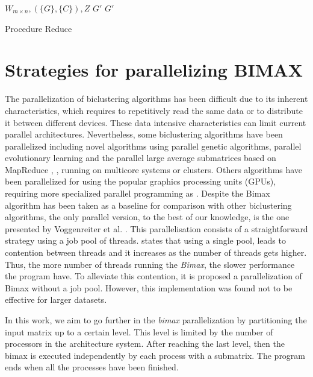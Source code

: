 \documentclass[a4paper,conference]{IEEEtran}
\begin{document}
\begin{algorithm}
\begin{algorithmic}[1]
\REQUIRE $W_{m\times n}, (\{G\}, \{C\}), Z$
\ENSURE $G'$
\ENDIF
\ENDFOR
\RETURN $G'$
\caption{Procedure Reduce}\label{alg:Reduce}
\end{algorithmic}
\end{algorithm}

\section{Strategies for parallelizing BIMAX}
The parallelization of biclustering algorithms has been difficult due to its inherent characteristics, which requires to repetitively read the same data or to distribute it between different devices. These data intensive characteristics can limit current parallel architectures.
Nevertheless, some biclustering algorithms have been parallelized including novel algorithms using parallel genetic algorithms, parallel evolutionary learning and the parallel large average submatrices based on MapReduce \cite{WeiShen2011}, \cite{Huang2012} \cite{lin2015parallel}, running on multicore systems or clusters. Others algorithms have been parallelized for using the popular graphics processing units (GPUs), requiring more specialized parallel programming as \cite{orzechowski2015effective}. Despite the Bimax algorithm has been taken as a baseline for comparison with other biclustering algorithms, the only parallel version, to the best of our knowledge, is the one presented by Voggenreiter et al. \cite{voggenreiter2014biclustering}. This parallelisation consists of a straightforward strategy using a job pool of threads. \cite{voggenreiter2014biclustering} states that using a single pool, leads to contention between threads and it increases as the number of threads gets higher. Thus, the more number of threads running the \textit{Bimax}, the slower performance the program have. To alleviate this contention, it is proposed a parallelization of Bimax without a job pool. However, this implementation was found not to be effective for larger datasets. 

In this work, we aim to go further in the \textit{bimax} parallelization by partitioning the input matrix up to a certain level. This level is limited by the number of processors in the architecture system. After reaching the last level, then the bimax is executed independently by each process with a submatrix. The program ends when all the processes have been finished. 
\end{document}
